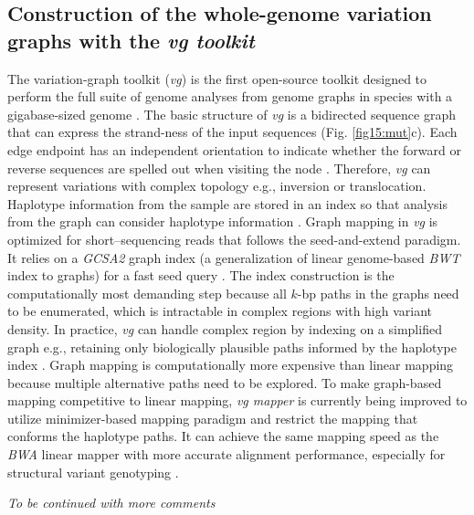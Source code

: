 \documentclass[../main.tex]{subfiles}
\begin{document}
\subsection{Construction of the whole-genome variation graphs with the \emph{vg toolkit}}

The variation-graph toolkit (\emph{vg}) is the first open-source toolkit designed to perform the full suite of genome analyses from genome graphs in species with a gigabase-sized genome \citep{garrison2018variation}. The basic structure of \emph{vg} is a bidirected sequence graph that can express the strand-ness of the input sequences (Fig. \ref{fig15:mut}c). Each edge endpoint has an independent orientation to indicate whether the forward or reverse sequences are spelled out when visiting the node \citep{paten2017genome}. Therefore, \emph{vg} can represent variations with complex topology e.g., inversion or translocation. Haplotype information from the sample are stored in an index so that analysis from the graph can consider haplotype information \citep{siren2020haplotype}. Graph mapping in \emph{ vg} is optimized for short–sequencing reads that follows the seed-and-extend paradigm. It relies on a \emph{GCSA2 }graph index (a generalization of linear genome-based\emph{ BWT} index to graphs) for a fast seed query \citep{siren2017indexing}. The index construction is the computationally most demanding step because all $k$-bp paths in the graphs need to be enumerated, which is intractable in complex regions with high variant density. In practice, \emph{vg} can handle complex region by indexing on a simplified graph e.g., retaining only biologically plausible paths informed by the haplotype index \citep{siren2017indexing}. Graph mapping is computationally more expensive than linear mapping because multiple alternative paths need to be explored. To make graph-based mapping competitive to linear mapping, \emph{vg mapper} is currently being improved to utilize minimizer-based mapping paradigm and restrict the mapping that conforms the haplotype paths. It can achieve the same mapping speed as the \emph{BWA} linear mapper with more accurate alignment performance, especially for structural variant genotyping \citep{siren2020genotyping}. 

\emph{To be continued with more comments}


\singlespacing
\footnotesize







\ifdefined\BuildingFromMainFile
\else
   
\end{document}

